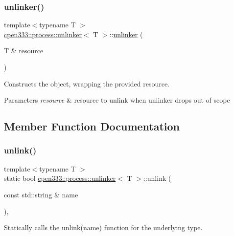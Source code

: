 \subsubsection{\texorpdfstring{unlinker()}{unlinker()}}
{\footnotesize\ttfamily template$<$typename T $>$ \\
\hyperlink{classcpen333_1_1process_1_1unlinker}{cpen333\+::process\+::unlinker}$<$ T $>$\+::\hyperlink{classcpen333_1_1process_1_1unlinker}{unlinker} (\begin{DoxyParamCaption}\item[{T \&}]{resource }\end{DoxyParamCaption})\hspace{0.3cm}{\ttfamily [inline]}}



Constructs the object, wrapping the provided resource. 


\begin{DoxyParams}{Parameters}
{\em resource} & resource to unlink when unlinker drops out of scope \\
\hline
\end{DoxyParams}


\subsection{Member Function Documentation}
\mbox{\label{classcpen333_1_1process_1_1unlinker_a00dd4ad138a95aa0173f81fd83c3210e}} 
\subsubsection{\texorpdfstring{unlink()}{unlink()}}
{\footnotesize\ttfamily template$<$typename T $>$ \\
static bool \hyperlink{classcpen333_1_1process_1_1unlinker}{cpen333\+::process\+::unlinker}$<$ T $>$\+::unlink (\begin{DoxyParamCaption}\item[{const std\+::string \&}]{name }\end{DoxyParamCaption})\hspace{0.3cm}{\ttfamily [inline]}, {\ttfamily [static]}}



Statically calls the {\ttfamily unlink(name)} function for the underlying type. 


